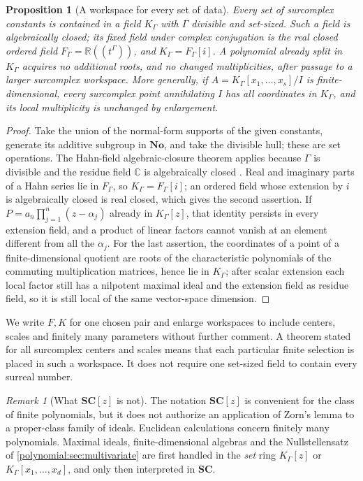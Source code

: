 \documentclass[11pt,letterpaper]{article}
\numberwithin{equation}{section}
\newtheorem{proposition}[theorem]{Proposition}
\theoremstyle{definition}
\theoremstyle{remark}\newtheorem{remark}[theorem]{Remark}
\newcommand{\No}{\mathbf{No}}
\newcommand{\SC}{\mathbf{SC}}
\newcommand{\C}{\mathbb C}
\newcommand{\R}{\mathbb R}
\begin{document}
\begin{proposition}[A workspace for every set of data]\label{polynomial:prop:workspace}
Every set of surcomplex constants is contained in a field $K_\Gamma$ with
$\Gamma$ divisible and set-sized. Such a field is algebraically closed; its
fixed field under complex conjugation is the real closed ordered field
$F_\Gamma=\R((t^\Gamma))$, and $K_\Gamma=F_\Gamma[i]$. A polynomial already
split in $K_\Gamma$ acquires no additional roots, and no changed
multiplicities, after passage to a larger surcomplex workspace. More
generally, if $A=K_\Gamma[x_1,\ldots,x_s]/I$ is finite-dimensional, every
surcomplex point annihilating $I$ has all coordinates in $K_\Gamma$, and its
local multiplicity is unchanged by enlargement.
\end{proposition}
\begin{proof}
Take the union of the normal-form supports of the given constants, generate
its additive subgroup in $\No$, and take the divisible hull; these are set
operations. The Hahn-field algebraic-closure theorem applies because $\Gamma$
is divisible and the residue field $\C$ is algebraically closed
\cite[Corollary~4]{polynomial:Poonen}. Real and imaginary parts of a Hahn
series lie in $F_\Gamma$, so $K_\Gamma=F_\Gamma[i]$; an ordered field whose
extension by $i$ is algebraically closed is real closed, which gives the
second assertion. If $P=a_n\prod_{j=1}^n(z-\alpha_j)$ already in $K_\Gamma[z]$,
that identity persists in every extension field, and a product of linear
factors cannot vanish at an element different from all the $\alpha_j$. For the
last assertion, the coordinates of a point of a finite-dimensional quotient
are roots of the characteristic polynomials of the commuting multiplication
matrices, hence lie in $K_\Gamma$; after scalar extension each local factor
still has a nilpotent maximal ideal and the extension field as residue field,
so it is still local of the same vector-space dimension.
\end{proof}

We write $F,K$ for one chosen pair and enlarge workspaces to include centers,
scales and finitely many parameters without further comment. A theorem stated
for all surcomplex centers and scales means that each particular finite
selection is placed in such a workspace. It does not require one set-sized
field to contain every surreal number.

\begin{remark}[{What $\SC[z]$ is not}]\label{polynomial:rem:classsafety}
The notation $\SC[z]$ is convenient for the class of finite polynomials, but
it does not authorize an application of Zorn's lemma to a proper-class family
of ideals. Euclidean calculations concern finitely many polynomials. Maximal
ideals, finite-dimensional algebras and the Nullstellensatz of
\cref{polynomial:sec:multivariate} are first handled in the \emph{set} ring
$K_\Gamma[z]$ or $K_\Gamma[x_1,\ldots,x_d]$, and only then interpreted in
$\SC$.
\end{remark}
\end{document}
